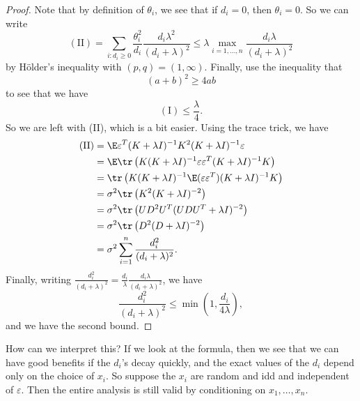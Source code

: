 \documentclass[a4paper]{article}
\begin{document}
\begin{proof}
  Note that by definition of $\theta_i$, we see that if $d_i = 0$, then $\theta_i = 0$. So we can write
  \[
    \mathrm{(II)} = \sum_{i: d_i \geq 0} \frac{\theta_i^2}{d_i} \frac{d_i \lambda^2}{(d_i + \lambda)^2} \leq \lambda \max_{i = 1, \ldots, n} \frac{d_i \lambda}{(d_i + \lambda)^2}
  \]
  by H\"older's inequality with $(p, q) = (1, \infty)$. Finally, use the inequality that
  \[
    (a + b)^2 \geq 4ab
  \]
  to see that we have
  \[
    \mathrm{(I)} \leq \frac{\lambda}{4}.
  \]
  So we are left with (II), which is a bit easier. Using the trace trick, we have
  \begin{align*}
    \mathrm{(II)} &= \E \varepsilon^T (K + \lambda I)^{-1} K^2 (K + \lambda I)^{-1} \varepsilon\\
    &= \E \tr \left(K (K + \lambda I)^{-1} \varepsilon \varepsilon^T (K + \lambda I)^{-1} K\right)\\
    &= \tr \left(K (K + \lambda I)^{-1} \E(\varepsilon \varepsilon^T) (K + \lambda I)^{-1} K\right)\\
    &= \sigma^2 \tr \left(K^2(K + \lambda I)^{-2}\right)\\
    &= \sigma^2 \tr \left(UD^2 U^T (UDU^T + \lambda I)^{-2}\right)\\
    &= \sigma^2 \tr \left(D^2 (D + \lambda I)^{-2}\right)\\
    &= \sigma^2 \sum_{i = 1}^n \frac{d_i^2}{(d_i + \lambda)^2}.
  \end{align*}
  Finally, writing $\frac{d_i^2}{(d_i + \lambda)^2} = \frac{d_i}{\lambda} \frac{d_i \lambda}{(d_i + \lambda)^2}$, we have
  \[
    \frac{d_i^2}{(d_i + \lambda)^2} \leq \min \left(1, \frac{d_i}{4 \lambda}\right),
  \]
  and we have the second bound.
\end{proof}
How can we interpret this? If we look at the formula, then we see that we can have good benefits if the $d_i$'s decay quickly, and the exact values of the $d_i$ depend only on the choice of $x_i$. So suppose the $x_i$ are random and idd and independent of $\varepsilon$. Then the entire analysis is still valid by conditioning on $x_1, \ldots, x_n$.
\end{document}

